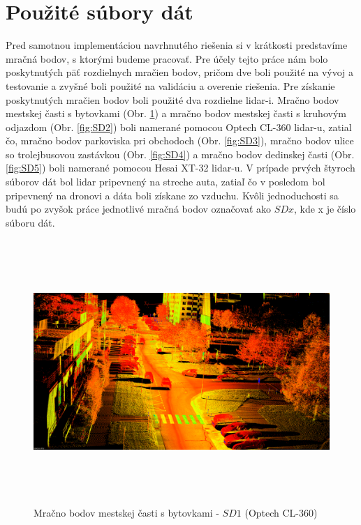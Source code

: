 \section{Použité súbory dát}
\noindent Pred samotnou implementáciou navrhnutého riešenia si v krátkosti predstavíme mračná bodov, s ktorými budeme pracovať. Pre účely tejto práce nám bolo poskytnutých päť rozdielnych mračien bodov, pričom dve boli použité na vývoj a testovanie a zvyšné boli použité na validáciu a overenie riešenia.
\newline\indent Pre získanie poskytnutých mračien bodov boli použité dva rozdielne \acrshort{lidar}-i. Mračno bodov mestskej časti s bytovkami (Obr. \ref{fig:SD1}) a mračno bodov mestskej časti s kruhovým odjazdom (Obr. \ref{fig:SD2}) boli namerané pomocou Optech CL-360 \acrshort{lidar}-u, zatial čo, mračno bodov parkoviska pri obchodoch (Obr. \ref{fig:SD3}), mračno bodov ulice so trolejbusovou zastávkou (Obr. \ref{fig:SD4}) a mračno bodov dedinskej časti (Obr. \ref{fig:SD5}) boli namerané pomocou Hesai XT-32 \acrshort{lidar}-u. V prípade prvých štyroch súborov dát bol \acrshort{lidar} pripevnený na streche auta, zatiaľ čo v posledom bol pripevnený na dronovi a dáta boli získane zo vzduchu.
\newline\indent  Kvôli jednoduchosti sa budú po zvyšok práce jednotlivé mračná bodov označovať ako $SDx$, kde x je číslo súboru dát.

\begin{figure}[!htbp]
  \centering
  \includegraphics[width=16cm, height=10cm]{img/SD1_example.png}
  \caption{Mračno bodov mestskej časti s bytovkami - $SD1$ (Optech CL-360)} 
  \label{fig:SD1}
\end{figure} 

